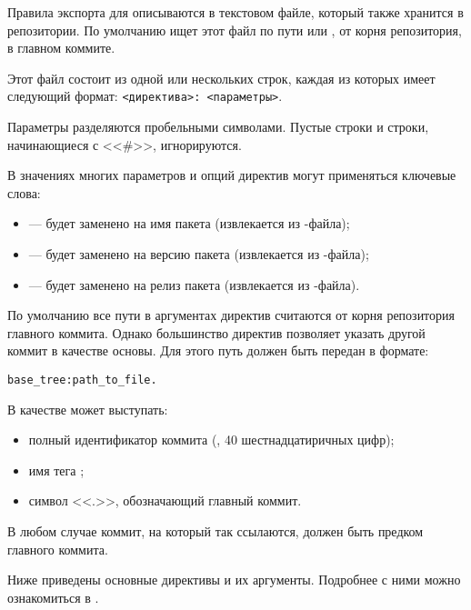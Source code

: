 Правила экспорта для  описываются в текстовом файле, который также хранится в репозитории.
По умолчанию  ищет этот файл по пути  или , от корня репозитория,
в главном коммите.

Этот файл состоит из одной или нескольких строк, каждая из которых имеет следующий формат: \verb!<директива>: <параметры>!.

Параметры разделяются пробельными символами.
Пустые строки и строки, начинающиеся с <<\#>>, игнорируются.

В значениях многих параметров и опций директив могут применяться ключевые слова:
\begin{itemize}
	\item {} --- будет заменено на имя пакета (извлекается из -файла);
	\item {} --- будет заменено на версию пакета (извлекается из -файла);
	\item {} --- будет заменено на релиз пакета (извлекается из -файла).
\end{itemize}


По умолчанию все пути в аргументах директив считаются от корня репозитория главного коммита.
Однако большинство директив позволяет указать другой коммит в качестве основы. Для этого путь
должен быть передан в формате:
\begin{verbatim}
base_tree:path_to_file.
\end{verbatim}

В качестве  может выступать:
\begin{itemize}
	\item полный идентификатор коммита (, 40 шестнадцатиричных цифр);
	\item имя тега ;
	\item символ <<.>>, обозначающий главный коммит.
\end{itemize}

В любом случае коммит, на который так ссылаются, должен быть предком главного коммита.


Ниже приведены основные директивы  и их аргументы. Подробнее с ними можно
ознакомиться в .

